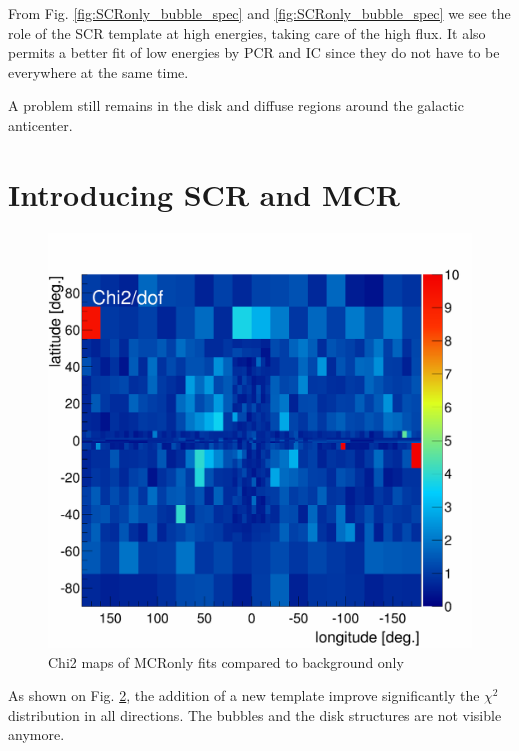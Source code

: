 \begin{figure}[h]
\begin{minipage}[h]{0.45\textwidth}
	  \label{fig:BKGonly_bubble_spec}
  \end{minipage}	 
\end{figure}

From Fig. \ref{fig:SCRonly_bubble_spec} and \ref{fig:SCRonly_bubble_spec} we see the role of the SCR template at high energies, taking care of the high flux. It also permits a better fit of low energies by PCR and IC since they do not have to be everywhere at the same time.

A problem still remains in the disk and diffuse regions around the galactic anticenter. 



\section{Introducing SCR and MCR}

\begin{figure}[h]
  \centering
  \includegraphics[width=.5\linewidth]{pic/results/MCRonly_chi2Distribution.png}
  \caption{Chi2 maps of MCRonly fits compared to background only}
  \label{fig:MCRonly_chi2Distribution}
\end{figure}

As shown on Fig. \ref{fig:MCRonly_chi2Distribution}, the addition of a new template improve significantly the $\chi^2$ distribution in all directions. The bubbles and the disk structures are not visible anymore.

